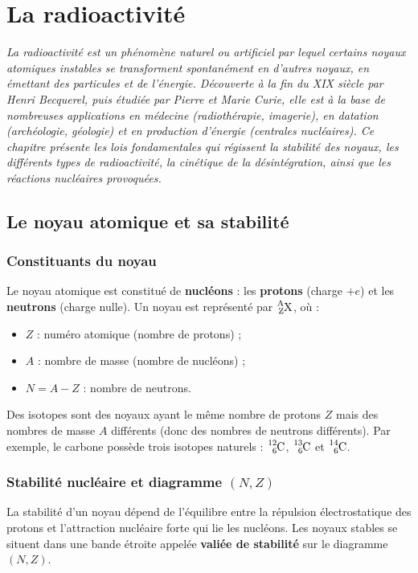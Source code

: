 \chapter{La radioactivité}

\textit{La radioactivité est un phénomène naturel ou artificiel par lequel certains noyaux atomiques instables se transforment spontanément en d'autres noyaux, en émettant des particules et de l'énergie. Découverte à la fin du XIX\ieme{} siècle par Henri Becquerel, puis étudiée par Pierre et Marie Curie, elle est à la base de nombreuses applications en médecine (radiothérapie, imagerie), en datation (archéologie, géologie) et en production d'énergie (centrales nucléaires). Ce chapitre présente les lois fondamentales qui régissent la stabilité des noyaux, les différents types de radioactivité, la cinétique de la désintégration, ainsi que les réactions nucléaires provoquées.}

\section{Le noyau atomique et sa stabilité}

\subsection{Constituants du noyau}
Le noyau atomique est constitué de \textbf{nucléons} : les \textbf{protons} (charge $+e$) et les \textbf{neutrons} (charge nulle). Un noyau est représenté par $\ce{^{A}_{Z}X}$, où :
\begin{itemize}
    \item $Z$ : numéro atomique (nombre de protons) ;
    \item $A$ : nombre de masse (nombre de nucléons) ;
    \item $N = A - Z$ : nombre de neutrons.
\end{itemize}

\begin{definition}[Isotopes]
Des isotopes sont des noyaux ayant le même nombre de protons $Z$ mais des nombres de masse $A$ différents (donc des nombres de neutrons différents). Par exemple, le carbone possède trois isotopes naturels : $\ce{^{12}_{6}C}$, $\ce{^{13}_{6}C}$ et $\ce{^{14}_{6}C}$.
\end{definition}

\subsection{Stabilité nucléaire et diagramme $(N,Z)$}
La stabilité d'un noyau dépend de l'équilibre entre la répulsion électrostatique des protons et l'attraction nucléaire forte qui lie les nucléons. Les noyaux stables se situent dans une bande étroite appelée \textbf{valiée de stabilité} sur le diagramme $(N,Z)$.

